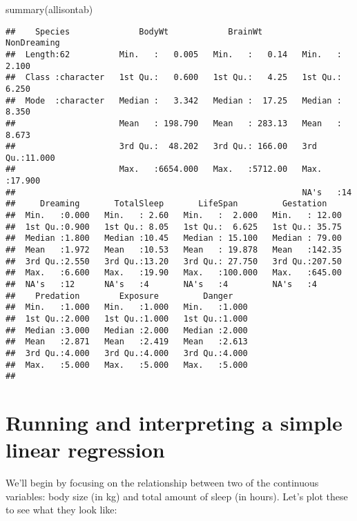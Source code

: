 \documentclass[
]{book}
\newenvironment{Shaded}{\begin{snugshade}}{\end{snugshade}}
\newcommand{\FunctionTok}[1]{\textcolor[rgb]{0.00,0.00,0.00}{#1}}
\newcommand{\NormalTok}[1]{#1}
\begin{document}
\begin{Shaded}
\begin{Highlighting}[]
\FunctionTok{summary}\NormalTok{(allisontab)}
\end{Highlighting}
\end{Shaded}

\begin{verbatim}
##    Species              BodyWt            BrainWt         NonDreaming    
##  Length:62          Min.   :   0.005   Min.   :   0.14   Min.   : 2.100  
##  Class :character   1st Qu.:   0.600   1st Qu.:   4.25   1st Qu.: 6.250  
##  Mode  :character   Median :   3.342   Median :  17.25   Median : 8.350  
##                     Mean   : 198.790   Mean   : 283.13   Mean   : 8.673  
##                     3rd Qu.:  48.202   3rd Qu.: 166.00   3rd Qu.:11.000  
##                     Max.   :6654.000   Max.   :5712.00   Max.   :17.900  
##                                                          NA's   :14      
##     Dreaming       TotalSleep       LifeSpan         Gestation     
##  Min.   :0.000   Min.   : 2.60   Min.   :  2.000   Min.   : 12.00  
##  1st Qu.:0.900   1st Qu.: 8.05   1st Qu.:  6.625   1st Qu.: 35.75  
##  Median :1.800   Median :10.45   Median : 15.100   Median : 79.00  
##  Mean   :1.972   Mean   :10.53   Mean   : 19.878   Mean   :142.35  
##  3rd Qu.:2.550   3rd Qu.:13.20   3rd Qu.: 27.750   3rd Qu.:207.50  
##  Max.   :6.600   Max.   :19.90   Max.   :100.000   Max.   :645.00  
##  NA's   :12      NA's   :4       NA's   :4         NA's   :4       
##    Predation        Exposure         Danger     
##  Min.   :1.000   Min.   :1.000   Min.   :1.000  
##  1st Qu.:2.000   1st Qu.:1.000   1st Qu.:1.000  
##  Median :3.000   Median :2.000   Median :2.000  
##  Mean   :2.871   Mean   :2.419   Mean   :2.613  
##  3rd Qu.:4.000   3rd Qu.:4.000   3rd Qu.:4.000  
##  Max.   :5.000   Max.   :5.000   Max.   :5.000  
## 
\end{verbatim}

\hypertarget{running-and-interpreting-a-simple-linear-regression-1}{%
\section{Running and interpreting a simple linear regression}\label{running-and-interpreting-a-simple-linear-regression-1}}

We'll begin by focusing on the relationship between two of the continuous variables: body size (in kg) and total amount of sleep (in hours). Let's plot these to see what they look like:
\end{document}
